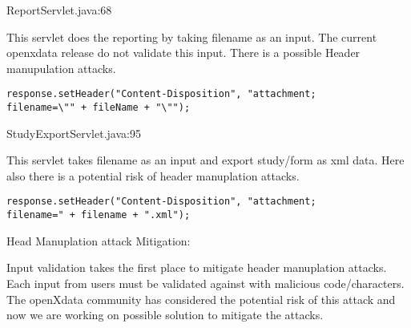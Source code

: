\documentclass[11pt,a4paper]{article}
\theoremstyle{definition}
\begin{document}
ReportServlet.java:68

This servlet does the reporting by taking filename as an input. The current openxdata release do not validate this input. There is a possible Header manupulation attacks.

\begin{lstlisting}
response.setHeader("Content-Disposition", "attachment; 
filename=\"" + fileName + "\"");
\end{lstlisting} 
 
 StudyExportServlet.java:95
 
 This servlet takes filename as an input and export study/form as xml data. Here also there is a potential risk of header manuplation attacks.
  
\begin{lstlisting}
response.setHeader("Content-Disposition", "attachment; 
filename=" + filename + ".xml");
\end{lstlisting} 
 
 Head Manuplation attack Mitigation:
 
Input validation takes the first place to mitigate header manuplation attacks. Each input from users must be validated against with malicious code/characters. The openXdata community has considered the potential risk of this attack and now we are working on possible solution to mitigate the attacks. 
 
 
\end{document}
